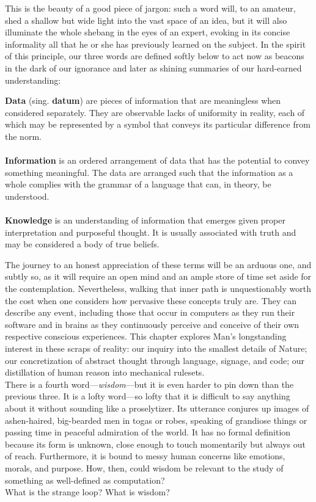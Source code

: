 This is the beauty of a good piece of jargon: such a word will, to an amateur, shed a shallow but wide light into the vast space of an idea, but it will also illuminate the whole shebang in the eyes of an expert, evoking in its concise informality all that he or she has previously learned on the subject. In the spirit of this principle, our three words are defined softly below to act now as beacons in the dark of our ignorance and later as shining summaries of our hard-earned understanding: \\

\begin{displayquote}
    \textbf{Data} (sing. \textbf{datum}) are pieces of information that are meaningless when considered separately. They are observable lacks of uniformity in reality, each of which may be represented by a symbol that conveys its particular difference from the norm. \\~\\
    \textbf{Information} is an ordered arrangement of data that has the potential to convey something meaningful. The data are arranged such that the information as a whole complies with the grammar of a language that can, in theory, be understood. \\~\\
    \textbf{Knowledge} is an understanding of information that emerges given proper interpretation and purposeful thought. It is usually associated with truth and may be considered a body of true beliefs. \\
\end{displayquote}

The journey to an honest appreciation of these terms will be an arduous one, and subtly so, as it will require an open mind and an ample store of time set aside for the contemplation. Nevertheless, walking that inner path is unquestionably worth the cost when one considers how pervasive these concepts truly are. They can describe any event, including those that occur in computers as they run their software and in brains as they continuously perceive and conceive of their own respective conscious experiences. This chapter explores Man's longstanding interest in these scraps of reality: our inquiry into the smallest details of Nature; our concretization of abstract thought through language, signage, and code; our distillation of human reason into mechanical rulesets. \\

There is a fourth word---\textit{wisdom}---but it is even harder to pin down than the previous three. It is a lofty word---so lofty that it is difficult to say anything about it without sounding like a proselytizer. Its utterance conjures up images of ashen-haired, big-bearded men in togas or robes, speaking of grandiose things or passing time in peaceful admiration of the world. It has no formal definition because its form is unknown, close enough to touch momentarily but always out of reach. Furthermore, it is bound to messy human concerns like emotions, morals, and purpose. How, then, could wisdom be relevant to the study of something as well-defined as computation? \\







What is the strange loop? What is wisdom?

